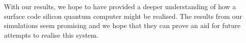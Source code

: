 With our results, we hope to have provided a deeper understanding of how a surface code silicon quantum computer might be realised. The results from our simulations seem promising and we hope that they can prove an aid for future attempts to realise this system. 













